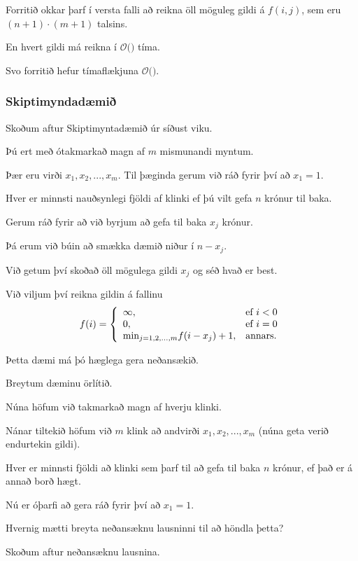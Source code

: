 {
	{
		\item<1-> Forritið okkar þarf í versta falli að reikna öll möguleg gildi á $f(i, j)$, sem eru $(n + 1) \cdot (m + 1)$ talsins.
		\item<2-> En hvert gildi má reikna í $\mathcal{O}($$)$ tíma.
		\item<4-> Svo forritið hefur tímaflækjuna $\mathcal{O}($\onslide<5->{$n \cdot m$}$)$.
	}
}

{
	\frametitle{Skiptimyndadæmið}
	{
		\item<1-> Skoðum aftur Skiptimyntadæmið úr síðust viku.
		\item<2-> Þú ert með ótakmarkað magn af $m$ mismunandi myntum.
		\item<3-> Þær eru virði  $x_1, x_2, ..., x_m$. Til þæginda gerum við ráð fyrir því að $x_1 = 1$.
		\item<4-> Hver er minnsti nauðsynlegi fjöldi af klinki ef þú vilt gefa $n$ krónur til baka.
	}
}

{
	{
		\item<1-> Gerum ráð fyrir að við byrjum að gefa til baka $x_j$ krónur.
		\item<2-> Þá erum við búin að smækka dæmið niður í $n - x_j$.
		\item<3-> Við getum því skoðað öll mögulega gildi $x_j$ og séð hvað er best.
		\item<4-> Við viljum því reikna gildin á fallinu
		\[
			f(i) = 
			\left \{
			\env{array}
			{
				{l l}
				\infty, & \text{ef $i < 0$}\\
				0, & \text{ef $i = 0$}\\
				\text{min}_{j = 1, 2, ..., m} f(i - x_j) + 1, & \text{annars}.
			}
			\right .
		\]
	}
}

{
}

{
	{
		\item<1-> Þetta dæmi má þó hæglega gera neðansækið.
	}
}

{
}

{
	{
		\item<1-> Breytum dæminu örlítið.
		\item<2-> Núna höfum við takmarkað magn af hverju klinki.
		\item<3-> Nánar tiltekið höfum við $m$ klink að andvirði $x_1, x_2, ..., x_m$ (núna geta verið endurtekin gildi).
		\item<4-> Hver er minnsti fjöldi að klinki sem þarf til að gefa til baka $n$ krónur, ef það er á annað borð hægt.
		\item<5-> Nú er óþarfi að gera ráð fyrir því að $x_1 = 1$.
		\item<6-> Hvernig mætti breyta neðansæknu lausninni til að höndla þetta?
		\item<7-> Skoðum aftur neðansæknu lausnina.
	}
}

